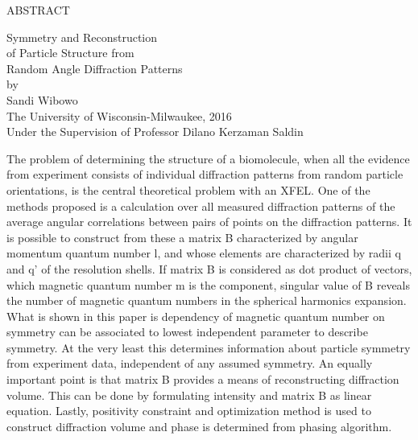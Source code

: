 \newpage
{}
\centerline{ABSTRACT}
\begin{center}
{\LARGE Symmetry and Reconstruction \\of Particle Structure from \\ Random Angle Diffraction Patterns }\\[1cm]
by\\[1cm]
Sandi Wibowo \\[2cm]
The University of Wisconsin-Milwaukee, 2016\\
Under the Supervision of Professor Dilano Kerzaman Saldin\\[2.5cm]
\end{center}
The problem of determining the structure of a biomolecule, when all the evidence from experiment consists of individual diffraction patterns from random particle orientations, is the central theoretical problem with an XFEL. 
One of the methods proposed is a calculation over all measured diffraction patterns of the average angular correlations between pairs of points on the diffraction patterns. 
It is possible to construct from these a matrix B characterized by angular momentum quantum number l, and whose elements are characterized by radii q and q' of the resolution shells. 
If matrix B is considered as dot product of vectors, which magnetic quantum number m is the component, singular value of B reveals the number of magnetic quantum numbers in the spherical harmonics expansion. 
What is shown in this paper is dependency of magnetic quantum number on symmetry can be associated to lowest independent parameter to describe symmetry. At the very least this determines information about particle symmetry from experiment data, independent of any assumed symmetry. 
An equally important point is that matrix B provides a means of reconstructing diffraction volume. This can be done by formulating intensity and matrix B as linear equation. Lastly, positivity constraint and optimization method is used to construct diffraction volume and phase is determined from phasing algorithm.
